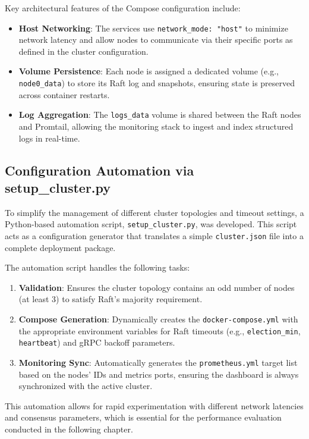 Key architectural features of the Compose configuration include:
\begin{itemize}
    \item \textbf{Host Networking}: The services use \texttt{network\_mode: "host"} to minimize network latency and allow nodes to communicate via their specific ports as defined in the cluster configuration.
    \item \textbf{Volume Persistence}: Each node is assigned a dedicated volume (e.g., \texttt{node0\_data}) to store its Raft log and snapshots, ensuring state is preserved across container restarts.
    \item \textbf{Log Aggregation}: The \texttt{logs\_data} volume is shared between the Raft nodes and Promtail, allowing the monitoring stack to ingest and index structured logs in real-time.
\end{itemize}

\subsection{Configuration Automation via setup\_cluster.py}
To simplify the management of different cluster topologies and timeout settings, a Python-based automation script, \texttt{setup\_cluster.py}, was developed. This script acts as a configuration generator that translates a simple \texttt{cluster.json} file into a complete deployment package.

The automation script handles the following tasks:
\begin{enumerate}
    \item \textbf{Validation}: Ensures the cluster topology contains an odd number of nodes (at least 3) to satisfy Raft's majority requirement.
    \item \textbf{Compose Generation}: Dynamically creates the \texttt{docker-compose.yml} with the appropriate environment variables for Raft timeouts (e.g., \texttt{election\_min}, \texttt{heartbeat}) and gRPC backoff parameters.
    \item \textbf{Monitoring Sync}: Automatically generates the \texttt{prometheus.yml} target list based on the nodes' IDs and metrics ports, ensuring the dashboard is always synchronized with the active cluster.
\end{enumerate}

This automation allows for rapid experimentation with different network latencies and consensus parameters, which is essential for the performance evaluation conducted in the following chapter.